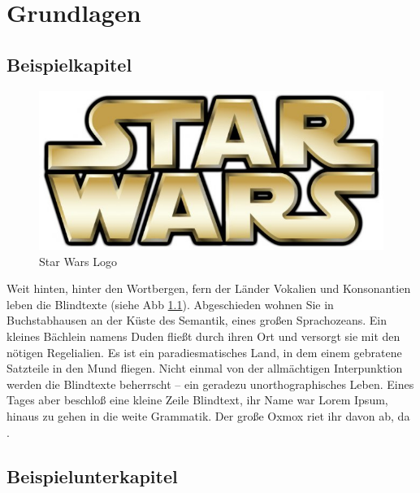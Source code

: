 \chapter{Grundlagen}
\label{sec:grundlagen}


\section{Beispielkapitel}
\label{sec:beispiel}
\begin{figure}[htb]
  \centering  
  \includegraphics[scale=0.5]{img/starwars.jpg}
  \caption{Star Wars Logo}
  \label{fig:starwars}
\end{figure}
Weit hinten, hinter den Wortbergen, fern der Länder Vokalien und Konsonantien leben die Blindtexte (siehe Abb \ref{fig:starwars}). Abgeschieden wohnen Sie in Buchstabhausen an der Küste des Semantik, eines großen Sprachozeans. Ein kleines Bächlein namens Duden fließt durch ihren Ort und versorgt sie mit den nötigen Regelialien. Es ist ein paradiesmatisches Land, in dem einem gebratene Satzteile in den Mund fliegen. Nicht einmal \cite{schroder_container-virtualisierung_2014} von der allmächtigen Interpunktion werden die Blindtexte beherrscht – ein geradezu unorthographisches Leben. Eines Tages aber beschloß eine kleine Zeile Blindtext, ihr Name war Lorem Ipsum, hinaus zu gehen in die weite Grammatik. Der große Oxmox riet ihr davon ab, da \cite[S. 100]{rudolph_servicebasierte_2009}.

\section{Beispielunterkapitel}
\label{subsec:beispiel}
